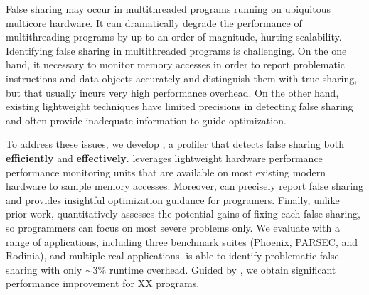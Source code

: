 
False sharing may occur in multithreaded programs running on ubiquitous multicore hardware. It can dramatically degrade the performance of multithreading programs by up to an order of magnitude, hurting scalability. Identifying false sharing in multithreaded programs is challenging. On the one hand, it necessary to monitor memory accesses in order to report problematic instructions and data objects accurately and distinguish them with true sharing, but that usually incurs very high performance overhead. On the other hand, existing lightweight techniques have limited precisions in detecting false sharing and often provide inadequate information to guide optimization.

\sloppy
To address these issues, we develop \cheetah{}, a profiler that detects false sharing both {\bf efficiently} and {\bf effectively}. \cheetah{} leverages lightweight hardware performance performance monitoring units that are available on most existing modern hardware to sample memory accesses. Moreover, \cheetah{} can precisely report false sharing and provides insightful optimization guidance for programers. Finally,
unlike prior work, \cheetah{} quantitatively assesses the potential gains of fixing each false sharing, so programmers can focus on most severe problems only. %
We evaluate \cheetah{} with a range of applications, including three benchmark suites (Phoenix, PARSEC, and Rodinia), and multiple real applications. \Cheetah{} is able to identify problematic false sharing with only  $\sim$3\% runtime overhead. Guided by \Cheetah{}, we obtain significant performance improvement for XX programs.

